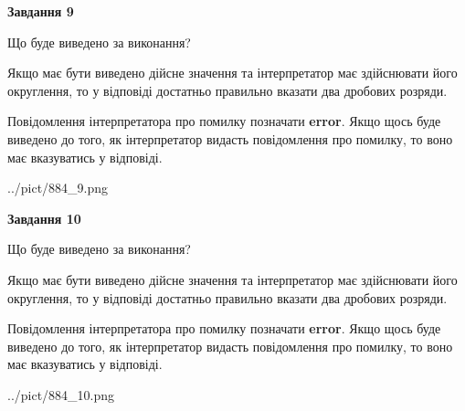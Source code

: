 \documentclass[12pt, ukrainian]{article}
\begin{document}
{\begin {Large}
{\begin {center}\textbf{Завдання 9}\end {center}}\par
Що буде виведено за виконання? \par

Якщо має бути виведено дійсне значення та інтерпретатор має здійснювати його округлення, 
то у відповіді достатньо правильно вказати два дробових розряди.

Повідомлення інтерпретатора про помилку позначати \textbf{error}.
Якщо щось буде виведено до того, як інтерпретатор видасть повідомлення про помилку, 
то воно має вказуватись у відповіді. \par

\begin{center}
	{../pict/884_9.png}
\end{center}
\newpage

{\begin {center}\textbf{Завдання 10}\end {center}}\par
Що буде виведено за виконання? \par

Якщо має бути виведено дійсне значення та інтерпретатор має здійснювати його округлення, 
то у відповіді достатньо правильно вказати два дробових розряди.

Повідомлення інтерпретатора про помилку позначати \textbf{error}.
Якщо щось буде виведено до того, як інтерпретатор видасть повідомлення про помилку, 
то воно має вказуватись у відповіді. \par

\begin{center}
	{../pict/884_10.png}
\end{center}
\newpage

\end {Large}}
\end{document}
